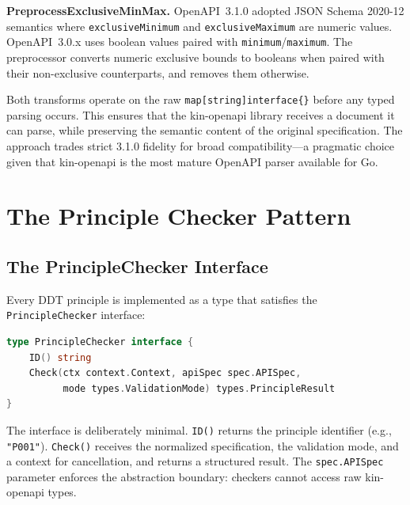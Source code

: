 \textbf{PreprocessExclusiveMinMax.} OpenAPI~3.1.0 adopted JSON Schema 2020-12 semantics where \texttt{exclusiveMinimum} and \texttt{exclusiveMaximum} are numeric values. OpenAPI~3.0.x uses boolean values paired with \texttt{minimum}/\texttt{maximum}. The preprocessor converts numeric exclusive bounds to booleans when paired with their non-exclusive counterparts, and removes them otherwise.

Both transforms operate on the raw \texttt{map[string]interface\{\}} before any typed parsing occurs. This ensures that the kin-openapi library receives a document it can parse, while preserving the semantic content of the original specification. The approach trades strict 3.1.0 fidelity for broad compatibility---a pragmatic choice given that kin-openapi is the most mature OpenAPI parser available for Go.

\section{The Principle Checker Pattern}
\label{sec:principle-checker}

\subsection{The PrincipleChecker Interface}
\label{subsec:checker-interface}

Every DDT principle is implemented as a type that satisfies the \texttt{PrincipleChecker} interface:

\begin{lstlisting}[language=Go,caption={The PrincipleChecker interface (\texttt{principles/checker.go}).},label={lst:checker}]
type PrincipleChecker interface {
    ID() string
    Check(ctx context.Context, apiSpec spec.APISpec,
          mode types.ValidationMode) types.PrincipleResult
}
\end{lstlisting}

The interface is deliberately minimal. \texttt{ID()} returns the principle identifier (e.g., \texttt{"P001"}). \texttt{Check()} receives the normalized specification, the validation mode, and a context for cancellation, and returns a structured result. The \texttt{spec.APISpec} parameter enforces the abstraction boundary: checkers cannot access raw kin-openapi types.


